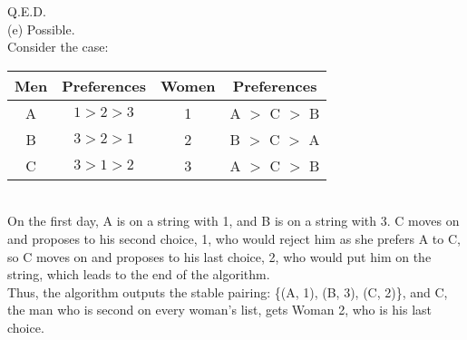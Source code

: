 \documentclass{article}
\begin{document}
\indent Q.E.D.\\[.5cm]
(e) Possible. \\[.15cm]
\indent Consider the case:\\[.3cm]
\begin{tabular}{ | c | c || c | c | }
\hline
Men & Preferences & Women & Preferences \\
\hline
A & $1>2>3$ & 1 & A $>$ C $>$ B \\
B & $3>2>1$ & 2 & B $>$ C $>$ A \\
C & $3>1>2$ & 3 & A $>$ C $>$ B \\
\hline
\end{tabular}\\[.3cm]
\indent On the first day, A is on a string with 1, and B is on a string with 3. C moves on and proposes to his second choice, 1, who would reject him as she prefers A to C, so C moves on and proposes to his last choice, 2, who would put him on the string, which leads to the end of the algorithm.\\
\indent Thus, the algorithm outputs the stable pairing: \{(A, 1), (B, 3), (C, 2)\}, and C, the man who is second on every woman's list, gets Woman 2, who is his last choice.\\[.5cm]
\end{document}
